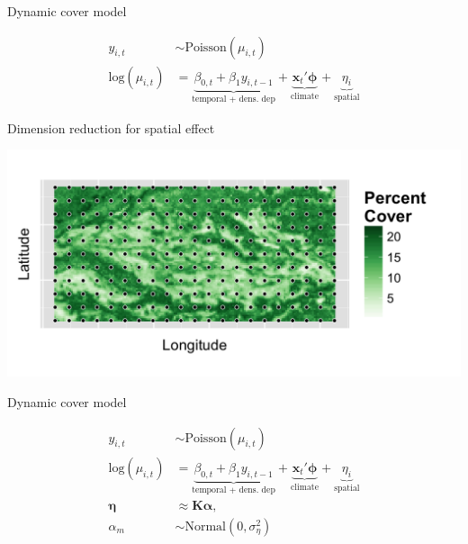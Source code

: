 \documentclass[14pt, compress, aspectratio=1610]{beamer}
\begin{document}
\begin{frame}{%
\protect\hypertarget{dynamic-cover-model}{%
Dynamic cover model}}

\begin{align*}
y_{i,t} &\sim \text{Poisson}(\mu_{i,t}) \\
\text{log}(\mu_{i,t}) &= \underbrace{\beta_{0,t} + \beta_{1}y_{i,t-1}}_\text{temporal + dens. dep} + \underbrace{\textbf{x}_{t}'\boldsymbol{\phi}}_\text{climate} + \underbrace{\eta_{i}}_\text{spatial}
\end{align*}

\end{frame}

\begin{frame}{%
\protect\hypertarget{dimension-reduction-for-spatial-effect}{%
Dimension reduction for spatial effect}}

\includegraphics[width=\textwidth]{./figures/SAGE_Grid_wKnots_subset.png}

\end{frame}

\begin{frame}{%
\protect\hypertarget{dynamic-cover-model-1}{%
Dynamic cover model}}

\begin{align*}
y_{i,t} &\sim \text{Poisson}(\mu_{i,t}) \\
\text{log}(\mu_{i,t}) &= \underbrace{\beta_{0,t} + \beta_{1}y_{i,t-1}}_\text{temporal + dens. dep} + \underbrace{\textbf{x}_{t}'\boldsymbol{\phi}}_\text{climate} + \underbrace{\eta_{i}}_\text{spatial} \\
\boldsymbol{\eta} &\approx \textbf{K}\boldsymbol{\alpha}, \\
\alpha_{m} &\sim \text{Normal}(0,\sigma_{\eta}^2)
\end{align*}

\end{frame}
\end{document}

